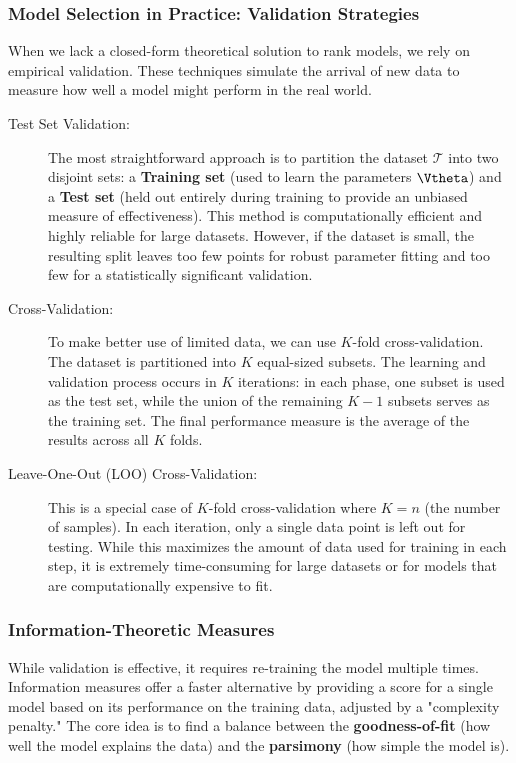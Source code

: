 \subsubsection*{Model Selection in Practice: Validation Strategies}

When we lack a closed-form theoretical solution to rank models, we rely on empirical validation. These techniques simulate the arrival of new data to measure how well a model might perform in the real world.

\begin{description}
    \item[Test Set Validation:] The most straightforward approach is to partition the dataset $\mathcal{T}$ into two disjoint sets: a \textbf{Training set} (used to learn the parameters $\Vtheta$) and a \textbf{Test set} (held out entirely during training to provide an unbiased measure of effectiveness). This method is computationally efficient and highly reliable for large datasets. However, if the dataset is small, the resulting split leaves too few points for robust parameter fitting and too few for a statistically significant validation.
    
    \item[Cross-Validation:] To make better use of limited data, we can use $K$-fold cross-validation. The dataset is partitioned into $K$ equal-sized subsets. The learning and validation process occurs in $K$ iterations: in each phase, one subset is used as the test set, while the union of the remaining $K-1$ subsets serves as the training set. The final performance measure is the average of the results across all $K$ folds.
    
    
    
    \item[Leave-One-Out (LOO) Cross-Validation:] This is a special case of $K$-fold cross-validation where $K=n$ (the number of samples). In each iteration, only a single data point is left out for testing. While this maximizes the amount of data used for training in each step, it is extremely time-consuming for large datasets or for models that are computationally expensive to fit.
\end{description}

\subsubsection*{Information-Theoretic Measures}

While validation is effective, it requires re-training the model multiple times. \alert{Information measures} offer a faster alternative by providing a score for a single model based on its performance on the training data, adjusted by a "complexity penalty." The core idea is to find a balance between the \textbf{goodness-of-fit} (how well the model explains the data) and the \textbf{parsimony} (how simple the model is).

